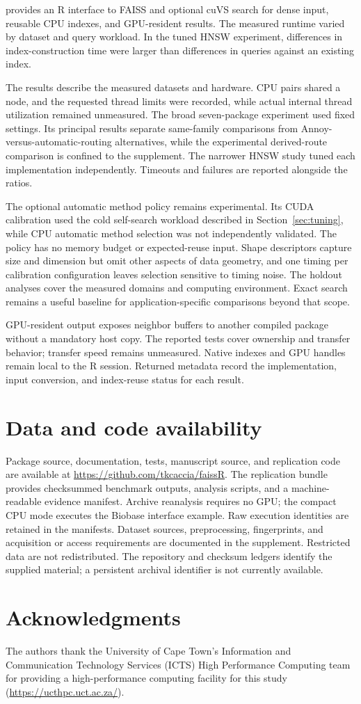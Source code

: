\documentclass[article]{jss}
\begin{document}
 provides an R interface to FAISS and optional cuVS search for
dense input, reusable CPU indexes, and GPU-resident results. The measured
runtime varied by dataset and query workload. In the tuned HNSW experiment,
differences in index-construction time were larger than differences in queries
against an existing index.

The results describe the measured datasets and hardware. CPU pairs shared a
node, and the requested thread limits were recorded, while actual internal
thread utilization remained unmeasured. The broad seven-package experiment
used fixed settings. Its principal results separate same-family comparisons
from Annoy-versus-automatic-routing alternatives, while the experimental
derived-route comparison is confined to the supplement. The narrower HNSW
study tuned each implementation independently. Timeouts and failures are
reported alongside the ratios.

The optional automatic method policy remains experimental. Its CUDA calibration used
the cold self-search workload described in Section~\ref{sec:tuning}, while CPU
automatic method selection was not independently validated. The policy has no memory
budget or expected-reuse input. Shape descriptors capture size and dimension
but omit other aspects of data geometry, and one timing per calibration
configuration leaves selection sensitive to timing noise. The holdout analyses
cover the measured domains and computing environment. Exact search remains a
useful baseline for application-specific comparisons beyond that scope.

GPU-resident output exposes neighbor buffers to another compiled package
without a mandatory host copy. The reported tests cover ownership and transfer
behavior; transfer speed remains unmeasured. Native indexes and GPU handles
remain local to the R session. Returned metadata record the implementation,
input conversion, and index-reuse status for each result.

\section*{Data and code availability}

Package source, documentation, tests, manuscript source, and replication code
are available at \url{https://github.com/tkcaccia/faissR}. The replication
bundle provides checksummed benchmark outputs, analysis scripts, and a
machine-readable evidence manifest. Archive reanalysis requires no GPU; the
compact CPU mode executes the Biobase interface example. Raw execution
identities are retained in the manifests. Dataset sources, preprocessing,
fingerprints, and acquisition or access requirements are documented in the
supplement. Restricted data are not redistributed. The repository and
checksum ledgers identify the supplied material; a persistent archival
identifier is not currently available.

\section*{Acknowledgments}

The authors thank the University of Cape Town's Information and Communication
Technology Services (ICTS) High Performance
Computing team for providing a high-performance computing facility for this
study (\url{https://ucthpc.uct.ac.za/}).


\end{document}
